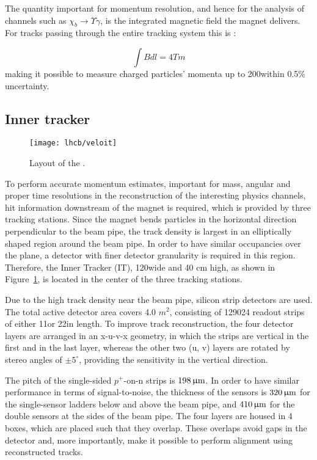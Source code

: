 The quantity important for momentum resolution, and hence for the analysis of
channels such as $\chi_b \rightarrow \Upsilon \gamma$, is the integrated magnetic field
the magnet delivers. For tracks passing through the entire tracking system this
is
\cite{Alves:2008zz}:   

$$ \int Bdl = 4 Tm $$ making it possible to measure charged particles' momenta
up to 200\gev within 0.5\% uncertainty.

\subsection{Inner tracker}

\begin{figure}[tb]
\begin{center}
\texttt{[image: lhcb/veloit]}
\end{center}
\caption{\small Layout of the \intr.}
\label{fig:veloit}
\end{figure}

To perform accurate momentum estimates, important for mass, angular and proper
time resolutions in the reconstruction of the interesting physics channels, 
hit information downstream of the magnet is required, which is
provided by three tracking stations. Since the magnet bends particles in the
horizontal direction perpendicular to the beam pipe, the track density is
largest in an elliptically shaped region around the beam pipe. In order to have
similar occupancies over the plane, a detector with finer detector granularity
is required in this region. Therefore, the Inner Tracker (IT), 120\cm wide and
40 cm high, as shown in Figure~\ref{fig:veloit}, is located in the center of
the three tracking stations.



Due to the high track density near the beam pipe, silicon strip detectors are
used. The total active detector area covers 4.0 $m^2$, consisting of 129024
readout strips of either 11\cm or 22\cm in length. To improve track
reconstruction, the four detector layers are arranged in an x-u-v-x geometry,
in which the strips are vertical in the first and in the last layer, whereas
the other two (u, v) layers are rotated by stereo angles of $\pm5^\circ$,
providing the sensitivity in the vertical direction.

The pitch of the single-sided $p^+$-on-n strips is $198{\,\upmu\rm m}$. In order to have
similar performance in terms of signal-to-noise, the thickness of the sensors
is $320{\,\upmu\rm m}$ for the single-sensor ladders below and above the beam pipe, and
$410{\,\upmu\rm m}$ for the double sensors at the sides of the beam pipe. The four
layers are housed in 4 boxes, which are placed such that they overlap. These
overlaps avoid gaps in the detector and, more importantly, make it possible to
perform alignment using reconstructed tracks.



